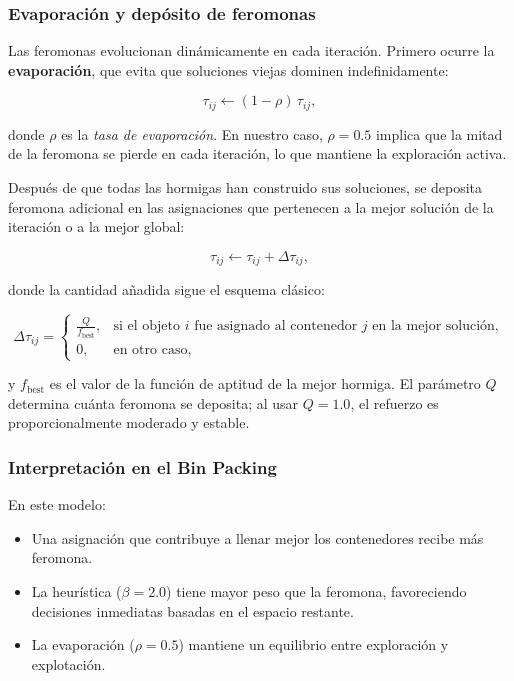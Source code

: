\subsubsection*{Evaporación y depósito de feromonas}

Las feromonas evolucionan dinámicamente en cada iteración.  
Primero ocurre la \textbf{evaporación}, que evita que soluciones viejas dominen indefinidamente:

\begin{equation}
\tau_{ij} \leftarrow (1 - \rho) \, \tau_{ij},
\label{eq:evaporacion}
\end{equation}

donde $\rho$ es la \textit{tasa de evaporación}.  
En nuestro caso, $\rho = 0.5$ implica que la mitad de la feromona se pierde en cada iteración, lo que mantiene la exploración activa.

Después de que todas las hormigas han construido sus soluciones, se deposita feromona adicional en las asignaciones que pertenecen a la mejor solución de la iteración o a la mejor global:

\begin{equation}
\tau_{ij} \leftarrow \tau_{ij} + \Delta \tau_{ij},
\end{equation}

donde la cantidad añadida sigue el esquema clásico:

\begin{equation}
\Delta \tau_{ij} = 
\begin{cases}
\displaystyle \frac{Q}{f_{\text{best}}}, & \text{si el objeto $i$ fue asignado al contenedor $j$ en la mejor solución}, \\
0, & \text{en otro caso},
\end{cases}
\label{eq:deposito}
\end{equation}

y $f_{\text{best}}$ es el valor de la función de aptitud de la mejor hormiga.  
El parámetro $Q$ determina cuánta feromona se deposita; al usar $Q = 1.0$, el refuerzo es proporcionalmente moderado y estable.

\subsubsection*{Interpretación en el Bin Packing}

En este modelo:

\begin{itemize}
    \item Una asignación que contribuye a llenar mejor los contenedores recibe más feromona.
    \item La heurística ($\beta = 2.0$) tiene mayor peso que la feromona, favoreciendo decisiones inmediatas basadas en el espacio restante.
    \item La evaporación ($\rho = 0.5$) mantiene un equilibrio entre exploración y explotación.
\end{itemize}

